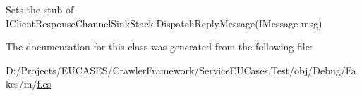 Sets the stub of I\-Client\-Response\-Channel\-Sink\-Stack.\-Dispatch\-Reply\-Message(\-I\-Message msg)



The documentation for this class was generated from the following file\-:\begin{DoxyCompactItemize}
\item 
D\-:/\-Projects/\-E\-U\-C\-A\-S\-E\-S/\-Crawler\-Framework/\-Service\-E\-U\-Cases.\-Test/obj/\-Debug/\-Fakes/m/\hyperlink{m_2f_8cs}{f.\-cs}\end{DoxyCompactItemize}
